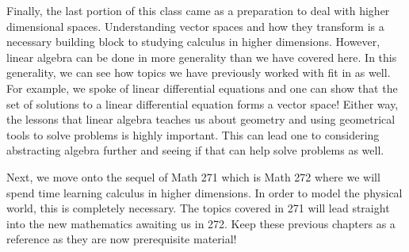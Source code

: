 Finally, the last portion of this class came as a preparation to deal with higher dimensional spaces.  Understanding vector spaces and how they transform is a necessary building block to studying calculus in higher dimensions.  However, linear algebra can be done in more generality than we have covered here.  In this generality, we can see how topics we have previously worked with fit in as well.  For example, we spoke of linear differential equations and one can show that the set of solutions to a linear differential equation forms a vector space! Either way, the lessons that linear algebra teaches us about geometry and using geometrical tools to solve problems is highly important.  This can lead one to considering abstracting algebra further and seeing if that can help solve problems as well.  

Next, we move onto the sequel of Math 271 which is Math 272 where we will spend time learning calculus in higher dimensions.  In order to model the physical world, this is completely necessary.   The topics covered in 271 will lead straight into the new mathematics awaiting us in 272.  Keep these previous chapters as a reference as they are now prerequisite material!